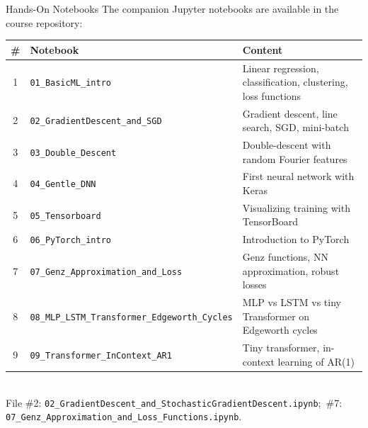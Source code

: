 \documentclass[aspectratio=169,11pt]{beamer}
\begin{document}
\begin{frame}{Hands-On Notebooks}
The companion Jupyter notebooks are available in the course repository:

\vspace{0.3cm}
\begin{center}
{\scriptsize
\renewcommand{\arraystretch}{1.15}
\begin{tabular}{clp{5.2cm}}
\toprule
\textbf{\#} & \textbf{Notebook} & \textbf{Content} \\
\midrule
1 & \texttt{01\_BasicML\_intro} & Linear regression, classification, clustering, loss functions \\
2 & \texttt{02\_GradientDescent\_and\_SGD} & Gradient descent, line search, SGD, mini-batch \\
3 & \texttt{03\_Double\_Descent} & Double-descent with random Fourier features \\
4 & \texttt{04\_Gentle\_DNN} & First neural network with Keras \\
5 & \texttt{05\_Tensorboard} & Visualizing training with TensorBoard \\
6 & \texttt{06\_PyTorch\_intro} & Introduction to PyTorch \\
7 & \texttt{07\_Genz\_Approximation\_and\_Loss} & Genz functions, NN approximation, robust losses \\
8 & \texttt{08\_MLP\_LSTM\_Transformer\_Edgeworth\_Cycles} & MLP vs LSTM vs tiny Transformer on Edgeworth cycles \\
9 & \texttt{09\_Transformer\_InContext\_AR1} & Tiny transformer, in-context learning of AR(1) \\
\bottomrule
\end{tabular}
\vspace{0.2cm}\\
{\tiny File \#2: \texttt{02\_GradientDescent\_and\_StochasticGradientDescent.ipynb};\ \#7: \texttt{07\_Genz\_Approximation\_and\_Loss\_Functions.ipynb}.}
}%
\end{center}
\end{frame}
\end{document}
